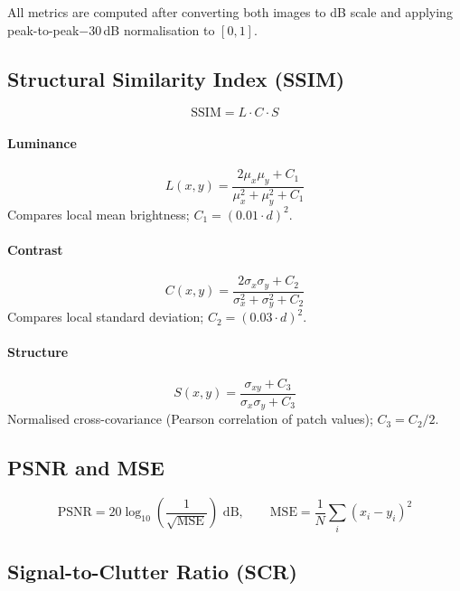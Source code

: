 \documentclass[12pt]{article}
\begin{document}
All metrics are computed after converting both images to dB scale and applying
peak-to-peak$-30$\,dB normalisation to $[0,1]$.

\subsection{Structural Similarity Index (SSIM)}

\begin{equation}
    \text{SSIM} = L \cdot C \cdot S
\end{equation}

\paragraph{Luminance}
\begin{equation}
    L(x,y) = \frac{2\mu_x\mu_y + C_1}{\mu_x^2 + \mu_y^2 + C_1}
\end{equation}
Compares local mean brightness; $C_1 = (0.01 \cdot d)^2$.

\paragraph{Contrast}
\begin{equation}
    C(x,y) = \frac{2\sigma_x\sigma_y + C_2}{\sigma_x^2 + \sigma_y^2 + C_2}
\end{equation}
Compares local standard deviation; $C_2 = (0.03 \cdot d)^2$.

\paragraph{Structure}
\begin{equation}
    S(x,y) = \frac{\sigma_{xy} + C_3}{\sigma_x\sigma_y + C_3}
\end{equation}
Normalised cross-covariance (Pearson correlation of patch values); $C_3 = C_2/2$.

\subsection{PSNR and MSE}

\begin{equation}
    \text{PSNR} = 20\log_{10}\!\left(\frac{1}{\sqrt{\text{MSE}}}\right) \text{ dB},
    \qquad
    \text{MSE} = \frac{1}{N}\sum_i (x_i - y_i)^2
\end{equation}

\subsection{Signal-to-Clutter Ratio (SCR)}
\end{document}
